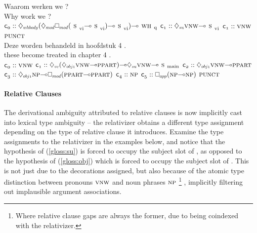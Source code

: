 \begin{exe}
\label{gloss:whq}
\glll Waarom werken we ? \\
Why work we ? \\
	$\con{0}::\ddia{whbody}(\ddia{mod}\dbox{mod}(\svi[s]\li\svi[s])\li\svi[s])\li\whq[s]$
	$\con{1}::\ddia{su}\vnw[s]\li\svi[s]$
	$\con{1}::\vnw[s]$
	$\punct[s]$\\
	
\label{gloss:passive}
\glll Deze worden behandeld in hoofdstuk 4 .\\
these become treated in chapter 4 .\\
	$\con{0}::\vnw[s]$
	$\con{1}::\ddia{vc}(\ddia{obj1}\vnw[s]\li\ppart[s])\li\ddia{su}\vnw[s]\li\smain[s]$
	$\con{2}::\ddia{obj1}\vnw[s]\li\ppart[s]$
	$\con{3}::\ddia{obj1}\np[s]\li\dbox{mod}(\ppart[s]\li\ppart[s])$
	$\con{4}::\np[s]$
	$\con{5}::\dbox{app}(\np[s]\li\np[s])$
	$\punct[s]$\\
\end{exe}


\paragraph{Relative Clauses}
The derivational ambiguity attributed to relative clauses is now implicitly cast into lexical type ambiguity -- the relativizer obtains a different type assignment depending on the type of relative clause it introduces.
Examine the type assignments to the relativizer  in the examples below, and notice that the hypothesis of (\ref{gloss:su}) is forced to occupy the subject slot of , as opposed to the hypothesis of (\ref{gloss:obj}) which is forced to occupy the subject slot of .
This is not just due to the decorations assigned, but also because of the atomic type distinction between pronouns $\vnw[s]$ and noun phrases $\np[s]$%
	\footnote{Where relative clause gaps are always the former, due to being coindexed with the relativizer.}%
, implicitly filtering out implausible argument associations.

